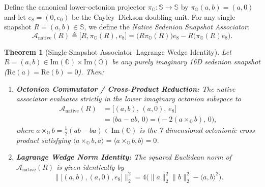 \documentclass[journal,twoside]{IEEEtran}
\newtheorem{theorem}{Theorem}
\theoremstyle{definition}
\theoremstyle{remark}
\newcommand{\Oc}{\mathbb{O}}
\newcommand{\Se}{\mathbb{S}}
\newcommand{\ImPart}{\mathrm{Im}}
\newcommand{\RePart}{\mathrm{Re}}
\newcommand{\Anative}{\mathcal{A}_{\mathrm{native}}}
\begin{document}
Define the canonical lower-octonion projector $\pi_{\Oc}: \Se \to \Se$ by $\pi_{\Oc}(a, b) = (a, 0)$ and let $e_8 = (0, e_0)$ be the Cayley--Dickson doubling unit. For any single snapshot $R = (a, b) \in \Se$, we define the \emph{Native Sedenion Snapshot Associator}:
\begin{equation}
    \Anative(R) \triangleq \bigl[R, \pi_{\Oc}(R), e_8\bigr] = \bigl(R \pi_{\Oc}(R)\bigr) e_8 - R \bigl(\pi_{\Oc}(R) e_8\bigr).
    \label{eq:anative_def}
\end{equation}

\begin{theorem}[Single-Snapshot Associator--Lagrange Wedge Identity]
\label{thm:associator_lagrange}
Let $R = (a, b) \in \ImPart(\Oc) \times \ImPart(\Oc)$ be any purely imaginary 16D sedenion snapshot ($\RePart(a) = \RePart(b) = 0$). Then:
\begin{enumerate}
    \item \textbf{Octonion Commutator / Cross-Product Reduction:} The native associator evaluates strictly in the lower imaginary octonion subspace to
    \begin{equation}
    \begin{aligned}
        \Anative(R) &= \bigl[(a, b),\, (a, 0),\, e_8\bigr] \\
        &= \bigl(ba - ab,\, 0\bigr) = \bigl(-2(a \times_{\Oc} b),\, 0\bigr),
    \end{aligned}
    \label{eq:thm_commutator}
    \end{equation}
    where $a \times_{\Oc} b = \frac{1}{2}(ab - ba) \in \ImPart(\Oc)$ is the 7-dimensional octonionic cross product satisfying $\langle a \times_{\Oc} b, a\rangle = \langle a \times_{\Oc} b, b\rangle = 0$.
    \item \textbf{Lagrange Wedge Norm Identity:} The squared Euclidean norm of $\Anative(R)$ is given identically by
    \begin{equation}
        \bigl\|\bigl[(a, b), (a, 0), e_8\bigr]\bigr\|_2^2 = 4\bigl(\|a\|_2^2 \|b\|_2^2 - \langle a, b \rangle^2\bigr).
        \label{eq:thm_lagrange_norm}
    \end{equation}
\end{enumerate}
\end{theorem}
\end{document}
